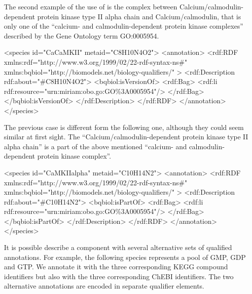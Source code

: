 The second example of the use of  is the
complex between Calcium/calmodulin-dependent protein kinase type
II alpha chain and Calcium/calmodulin, that is only one of the
``calcium- and calmodulin-dependent protein kinase complexes''
described by the Gene Ontology term GO:0005954.

\begin{blockChanged}
\begin{example}
<species id="CaCaMKII" metaid="C8H10N4O2">
  <annotation>
    <rdf:RDF
      xmlns:rdf="http://www.w3.org/1999/02/22-rdf-syntax-ns\#"
      xmlns:bqbiol="http://biomodels.net/biology-qualifiers/"
    >
      <rdf:Description rdf:about="\#C8H10N4O2">
        <bqbiol:isVersionOf>
          <rdf:Bag>
            <rdf:li rdf:resource="urn:miriam:obo.go:GO\%3A0005954"/>
          </rdf:Bag>
        </bqbiol:isVersionOf>
      </rdf:Description>
    </rdf:RDF>
  </annotation>
</species>
\end{example}
\end{blockChanged}

The previous case is different form the following one, although they
could seem similar at first sight. The
``Calcium/calmodulin-dependent protein kinase type II alpha
chain'' is a part of the above mentioned ``calcium- and
calmodulin-dependent protein kinase complex''.

\begin{blockChanged}
\begin{example}
<species id="CaMKIIalpha" metaid="C10H14N2">
  <annotation>
    <rdf:RDF
      xmlns:rdf="http://www.w3.org/1999/02/22-rdf-syntax-ns\#"
      xmlns:bqbiol="http://biomodels.net/biology-qualifiers/"
    >
      <rdf:Description rdf:about="\#C10H14N2">
        <bqbiol:isPartOf>
          <rdf:Bag>
            <rdf:li rdf:resource="urn:miriam:obo.go:GO\%3A0005954"/>
          </rdf:Bag>
        </bqbiol:isPartOf>
      </rdf:Description>
    </rdf:RDF>
  </annotation>
</species>
\end{example}
\end{blockChanged}

It is possible describe a component with several alternative sets
of qualified annotations. For example, the following species
represents a pool of  GMP, GDP and GTP. We annotate it with the
three corresponding KEGG compound identifiers but also with the
three corresponding ChEBI identifiers.  The two alternative
annotations are encoded in separate  qualifier
elements.

